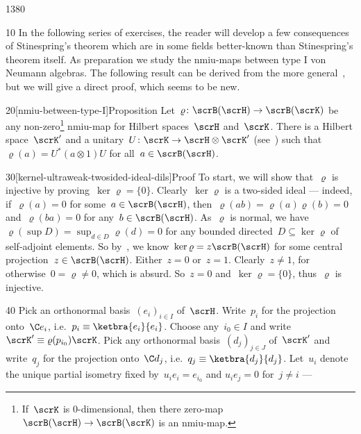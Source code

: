 \begin{parsec}{1380}%
\begin{point}{10}%
In the following series of exercises, the reader will develop
    a few consequences of Stinespring's theorem
    which are in some fields better-known than
    Stinespring's theorem itself.
As preparation we study the nmiu-maps between type I von Neumann algebras.
The following result can be derived
    from the more general~\cite[thm.~5.5]{Takesaki1},
    but we will give a direct proof,
    which seems to be new.~\cite{ref1382}
\end{point}
\begin{point}{20}[nmiu-between-type-I]{Proposition}%
Let~$\varrho\colon \scrB(\scrH) \to \scrB(\scrK)$    
    be any non-zero\footnote{
        If~$\scrK$ is 0-dimensional,
            then there zero-map~$\scrB(\scrH) \to \scrB(\scrK)$
            is an nmiu-map.} nmiu-map for Hilbert spaces~$\scrH$ and~$\scrK$.
There is a Hilbert space~$\scrK'$
    and a unitary~$U\colon \scrK \to \scrH \otimes \scrK'$
    (see~)
    such that~$\varrho(a) = U^* (a\otimes 1) U $
    for all~$a \in \scrB(\scrH)$.
    \begin{point}{30}[kernel-ultraweak-twosided-ideal-dils]{Proof}%
To start, we will show that~$\varrho$ is injective
    by proving~$\ker\varrho = \{0\}$.
Clearly~$\ker \varrho$ is a two-sided ideal
    --- indeed, if~$\varrho(a) = 0$ for some~$a\in \scrB(\scrH)$,
    then~$\varrho(ab) = \varrho(a)\varrho(b) = 0$
        and~$\varrho(ba) = 0$
        for any~$b \in \scrB(\scrH)$.
As~$\varrho$ is normal,
    we have~$\varrho(\sup D) = \sup_{d \in D} \varrho(d) = 0$
    for any bounded directed~$D\subseteq \ker \varrho$
    of self-adjoint elements.
So by~,
    we know~$\ker \varrho = z \scrB(\scrH)$
    for some central projection~$z \in \scrB(\scrH)$.
Either~$z=0$ or~$z=1$.
Clearly~$z\neq 1$, for otherwise~$0=\varrho\neq 0$, which is absurd.
    So~$z=0$ and~$\ker \varrho = \{0\}$, thus~$\varrho $ is injective.
\begin{point}{40}%
Pick an orthonormal basis~$(e_i)_{i \in I}$ of~$\scrH$.
Write~$p_i$ for the projection onto~$\C e_i$,
    i.e.~$p_i \equiv \ketbra{e_i}{e_i}$.
Choose any~$i_0 \in I$
    and write~$\scrK' \equiv \varrho(p_{i_0}) \scrK$.
Pick any orthonormal basis~$(d_j)_{j \in J}$ of~$\scrK'$
    and write~$q_j$ for the projection onto~$\C d_j$,
    i.e.~$q_j \equiv \ketbra{d_j}{d_j}$.
Let~$u_i$ denote the unique partial
        isometry fixed by~$u_i e_i = e_{i_0}$ and
                $u_i e_j = 0$ for~$j\neq i$ ---

\end{point}
\end{point}
\end{point}
\end{parsec}
